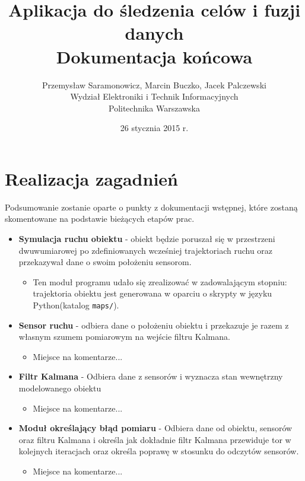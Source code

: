 \documentclass{article}
\title{Aplikacja do śledzenia celów i fuzji danych  \\ {\large Dokumentacja końcowa}}
\author{Przemysław Saramonowicz, Marcin Buczko, Jacek Palczewski \\ Wydział Elektroniki i Technik Informacyjnych \\ Politechnika Warszawska}
\date{26 stycznia 2015 r.}
\begin{document}
	\maketitle
	
	\section{Realizacja zagadnień}
		Podsumowanie zostanie oparte o punkty z dokumentacji wstępnej, które zostaną skomentowane na podstawie bieżących etapów prac.	
		\begin{itemize}
		\item \textbf{Symulacja ruchu obiektu} - obiekt będzie poruszał się w przestrzeni dwuwumiarowej po zdefiniowanych wcześniej trajektoriach ruchu oraz przekazywał dane o swoim położeniu sensorom.
		\begin{itemize}
			\item Ten moduł programu udało się zrealizować w zadowalającym stopniu: trajektoria obiektu jest generowana w oparciu o skrypty w języku Python(katalog \texttt{maps/}).
		\end{itemize}

		\item \textbf{Sensor ruchu} - odbiera dane o położeniu obiektu i przekazuje je razem z własnym szumem pomiarowym na wejście filtru Kalmana.
			\begin{itemize}
				\item Miejsce na komentarze... 
			\end{itemize}

		\item \textbf{Filtr Kalmana} - Odbiera dane z sensorów i wyznacza stan wewnętrzny modelowanego obiektu
			\begin{itemize}
				\item Miejsce na komentarze... 
			\end{itemize}
		
		\item \textbf{Moduł określający błąd pomiaru} - Odbiera dane od obiektu, sensorów oraz filtru Kalmana i określa jak dokładnie filtr Kalmana przewiduje tor w kolejnych iteracjach oraz określa poprawę w stosunku do odczytów sensorów.
			\begin{itemize}
				\item Miejsce na komentarze... 
			\end{itemize}
				

\end{itemize}
\end{document}

